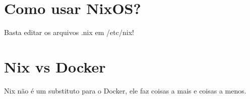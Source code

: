 \documentclass[presentation]{beamer}
\begin{document}
\section{Como usar NixOS?}
\label{sec:orgfcae63d}

\begin{frame}[label={sec:org55df5e7}]{Basta editar os arquivos .nix em /etc/nix!}
\end{frame}

\section{Nix vs Docker}
\label{sec:org88c08b1}

\begin{frame}[label={sec:org0d8f2d7}]{Nix não é um substituto para o Docker, ele faz coisas a mais e coisas a menos.}
\end{frame}
\end{document}
